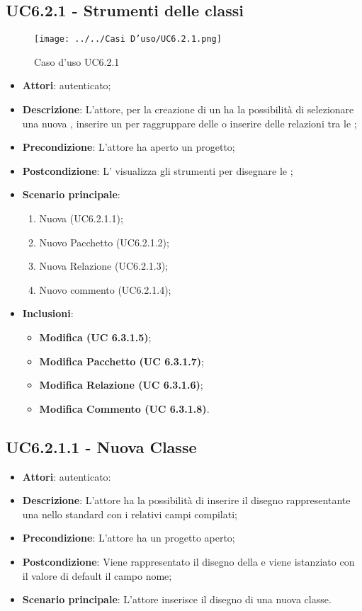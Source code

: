\subsection{UC6.2.1 - Strumenti delle classi}
\label{ssec:UC6.2.1}
\begin{figure}[h!]
\centering
\texttt{[image: ../../Casi D'uso/UC6.2.1.png]}
\caption{Caso d'uso UC6.2.1}
 \end{figure}
\begin{itemize}
\item \textbf{Attori}:  autenticato;
\item \textbf{Descrizione}: L'attore, per la creazione di un  ha la possibilità di selezionare una nuova , inserire un  per raggruppare delle  o inserire delle relazioni tra le ;
\item \textbf{Precondizione}: L'attore ha aperto un progetto;
\item \textbf{Postcondizione}: L' visualizza gli strumenti per disegnare le ;
\item \textbf{Scenario principale}: \begin{enumerate}\item Nuova  (UC6.2.1.1);\item Nuovo Pacchetto (UC6.2.1.2);\item Nuova Relazione (UC6.2.1.3);\item Nuovo commento (UC6.2.1.4);
 \end{enumerate}
 \item \textbf{Inclusioni}: \begin{itemize}
 	\item \textbf{ Modifica  (UC 6.3.1.5)};
 	\item \textbf{ Modifica Pacchetto (UC 6.3.1.7)};
 	\item \textbf{ Modifica Relazione (UC 6.3.1.6)};
 	\item \textbf{ Modifica Commento (UC 6.3.1.8)}.
 \end{itemize}
\end{itemize}
\subsection{UC6.2.1.1 - Nuova Classe}
\label{ssec:UC6.2.1.1}
\begin{itemize}
\item \textbf{Attori}:  autenticato:
\item \textbf{Descrizione}: L'attore ha la possibilità di inserire il disegno rappresentante una  nello standard  con i relativi campi compilati;
\item \textbf{Precondizione}: L'attore ha un progetto aperto;
\item \textbf{Postcondizione}: Viene rappresentato il disegno della  e viene istanziato con il valore di default il campo nome;
\item \textbf{Scenario principale}: L'attore inserisce il disegno di una nuova classe.
\end{itemize}
